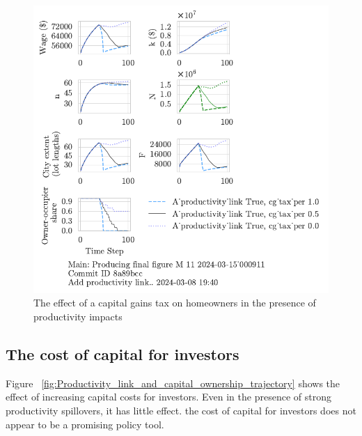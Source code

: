 \begin{figure}
    \centering
    \includegraphics[scale=1, trim={0 1.4cm 0 0},clip]{fig/With-productivity_link_cg_tax_per-000911.pdf}
    \caption{The effect of a capital gains tax on homeowners in the presence of productivity impacts}
    \label{fig:Productivity_link_and_CGpers_ownership_trajectory}
\end{figure}

\newpage
\subsection{The cost of capital for investors}
Figure ~\ref{fig:Productivity_link_and_capital_ownership_trajectory} shows the effect of increasing capital costs for investors. Even in the presence of strong productivity spillovers, it has little effect.  the cost of capital for investors does not appear to be a promising policy tool.

